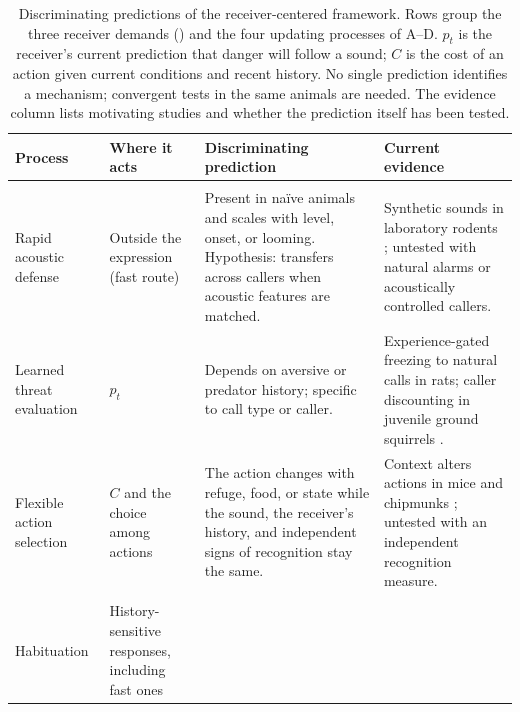 \begin{table}[tbp]
\centering
\footnotesize
\singlespacing
\setlength{\tabcolsep}{5pt}
\renewcommand{\arraystretch}{1.15}
\setlength{\belowcaptionskip}{6pt}
\caption{Discriminating predictions of the receiver-centered framework. Rows group the three receiver demands () and the four updating processes of A--D. $p_t$ is the receiver's current prediction that danger will follow a sound; $C$ is the cost of an action given current conditions and recent history. No single prediction identifies a mechanism; convergent tests in the same animals are needed. The evidence column lists motivating studies and whether the prediction itself has been tested.}
\label{tab:predictions}
\begin{tabular}{@{}>{\raggedright\arraybackslash}p{1.05in}>{\raggedright\arraybackslash}p{0.9in}>{\raggedright\arraybackslash}p{2.05in}>{\raggedright\arraybackslash}p{2.05in}@{}}
\toprule
\textbf{Process} & \textbf{Where it acts} & \textbf{Discriminating prediction} & \textbf{Current evidence} \\
\midrule
\multicolumn{4}{@{}l}{\textit{Receiver demands}} \\
Rapid acoustic defense
  & Outside the expression (fast route)
  & Present in naïve animals and scales with level, onset, or looming. Hypothesis: transfers across callers when acoustic features are matched.
  & Synthetic sounds in laboratory rodents \citep{DavisEtAl1982,XiongEtAl2015,LiEtAl2021}; untested with natural alarms or acoustically controlled callers. \\
Learned threat evaluation
  & $p_t$
  & Depends on aversive or predator history; specific to call type or caller.
  & Experience-gated freezing to natural calls in rats; caller discounting in juvenile ground squirrels \citep{KimEtAl2010,HareAtkins2001}. \\
Flexible action selection
  & $C$ and the choice among actions
  & The action changes with refuge, food, or state while the sound, the receiver's history, and independent signs of recognition stay the same.
  & Context alters actions in mice and chipmunks \citep{MongeauEtAl2003,BaackSwitzer2000}; untested with an independent recognition measure. \\
\midrule
\multicolumn{4}{@{}l}{\textit{Updating processes}} \\
Habituation
  & History-sensitive responses, including fast ones

\end{tabular}
\end{table}
